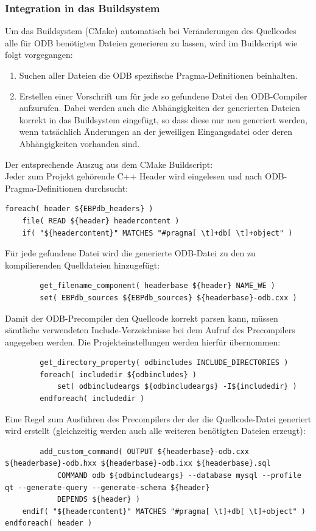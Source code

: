 \subsubsection{Integration in das Buildsystem}
Um das Buildsystem (CMake) automatisch bei Veränderungen des Quellcodes alle für ODB benötigten Dateien generieren zu lassen, wird im Buildscript wie folgt vorgegangen:
\begin{enumerate}
\item Suchen aller Dateien die ODB spezifische Pragma-Definitionen beinhalten.
\item Erstellen einer Vorschrift um für jede so gefundene Datei den ODB-Compiler aufzurufen.
	Dabei werden auch die Abhängigkeiten der generierten Dateien korrekt in das Buildsystem eingefügt, so dass diese nur neu generiert werden, wenn tatsächlich Änderungen an der jeweiligen Eingangsdatei oder deren Abhängigkeiten vorhanden sind.
\end{enumerate}
Der entsprechende Auszug aus dem CMake Buildscript:\\
\lstset{language=clean}
Jeder zum Projekt gehörende C++ Header wird eingelesen und nach ODB-Pragma-Definitionen durchsucht:
\begin{lstlisting}
foreach( header ${EBPdb_headers} )
	file( READ ${header} headercontent )
	if( "${headercontent}" MATCHES "#pragma[ \t]+db[ \t]+object" )
\end{lstlisting}
Für jede gefundene Datei wird die generierte ODB-Datei zu den zu kompilierenden Quelldateien hinzugefügt:
\begin{lstlisting}
		get_filename_component( headerbase ${header} NAME_WE )
		set( EBPdb_sources ${EBPdb_sources} ${headerbase}-odb.cxx )
\end{lstlisting}
Damit der ODB-Precompiler den Quellcode korrekt parsen kann, müssen sämtliche verwendeten Include-Verzeichnisse bei dem Aufruf des Precompilers angegeben werden. Die Projekteinstellungen werden hierfür übernommen:
\begin{lstlisting}
		get_directory_property( odbincludes INCLUDE_DIRECTORIES )
		foreach( includedir ${odbincludes} )
			set( odbincludeargs ${odbincludeargs} -I${includedir} )
		endforeach( includedir )
\end{lstlisting}
Eine Regel zum Ausführen des Precompilers der der die Quellcode-Datei generiert wird erstellt (gleichzeitig werden auch alle weiteren benötigten Dateien erzeugt):
\begin{lstlisting}
		add_custom_command( OUTPUT ${headerbase}-odb.cxx ${headerbase}-odb.hxx ${headerbase}-odb.ixx ${headerbase}.sql
			COMMAND odb ${odbincludeargs} --database mysql --profile qt --generate-query --generate-schema ${header}
			DEPENDS ${header} )
	endif( "${headercontent}" MATCHES "#pragma[ \t]+db[ \t]+object" )
endforeach( header )
\end{lstlisting}


